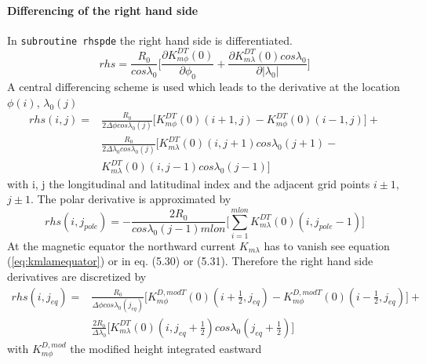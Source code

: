 \paragraph{Differencing of the right hand side}\label{page:finite_rhs}
%
In \texttt{subroutine rhspde} the right hand side is differentiated. 
%
\begin{equation}
   rhs = \frac{R_0}{cos \lambda_0} \bigl[ \frac{\partial K_{m \phi}^{DT}(0)}{\partial \phi_0} +  
   \frac{\partial K_{m \lambda }^{DT}(0) cos \lambda_0}{\partial | \lambda_0 |}
   \bigr] \label{eq:diff_rhs}
\end{equation}
%
A central differencing scheme is used which leads to the derivative at the location 
$\phi(i)$, $\lambda_0(j)$
%
\begin{equation}
\begin{split}
  rhs(i,j) = & \frac{R_0}{ 2 \Delta \phi cos \lambda_0(j)} \bigl[ K_{m \phi}^{DT}(0)(i+1,j) - 
      K_{m \phi}^{DT}(0)(i-1,j)\bigr] + \\
   & \frac{R_0}{ 2 \Delta \lambda_0 cos \lambda_0(j)} \bigl[ K_{m \lambda }^{DT}(0)(i,j+1) 
    cos \lambda_0(j+1)- \\
    &  K_{m \lambda }^{DT}(0)(i,j-1)cos \lambda_0(j-1) \bigr] 
\end{split}
\end{equation}
%
with i, j the longitudinal and latitudinal index and the adjacent grid points $i\pm 1$,$j \pm1$.
The polar derivative is approximated by
%
\begin{equation}
   rhs (i,j_{pole}) = - \frac{2 R_0}{cos \lambda_0(j-1) mlon} \bigl[ \sum_{i=1}^{mlon} 
       K_{m \lambda }^{DT}(0)(i,j_{pole} - 1)  \bigr]
\end{equation}
%
At the magnetic equator the northward current $K_{m \lambda} $ has to
vanish see equation (\ref{eq:kmlamequator}) or  in \cite{rich95} eq. (5.30)
or (5.31). Therefore the right hand side derivatives are discretized by
%
\begin{equation}
  \begin{split}
  rhs(i,j_{eq}) =&  \frac{R_0}{  \Delta \phi cos \lambda_0(j_{eq})} \bigl[ K_{m \phi}^{D, mod T}(0)(i+\frac{1}{2},j_{eq}) - 
      K_{m \phi}^{D, mod T}(0)(i-\frac{1}{2},j_{eq})\bigr] + \\
     &\frac{2 R_0}{ \Delta \lambda_0 } \bigl[ K_{m \lambda }^{DT}(0)(i,j_{eq}+\frac{1}{2}) 
    cos \lambda_0(j_{eq}+\frac{1}{2}) \bigr] \label{eq:rhs_eq1}
  \end{split}
\end{equation}
%
with $ K_{m \phi}^{D, mod}$ the modified height integrated eastward
